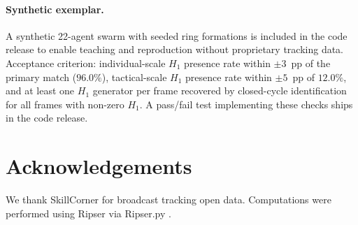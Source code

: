\documentclass[11pt,a4paper]{article}
\begin{document}
\paragraph{Synthetic exemplar.} A synthetic 22-agent swarm with seeded ring formations is included in the code release to enable teaching and reproduction without proprietary tracking data. Acceptance criterion: individual-scale $H_1$ presence rate within $\pm 3$~pp of the primary match ($96.0\%$), tactical-scale $H_1$ presence rate within $\pm 5$~pp of $12.0\%$, and at least one $H_1$ generator per frame recovered by closed-cycle identification for all frames with non-zero $H_1$. A pass/fail test implementing these checks ships in the code release.

\section*{Acknowledgements}

We thank SkillCorner for broadcast tracking open data. Computations were performed using Ripser \citep{Bauer2021} via Ripser.py \citep{Tralie2018}.



\end{document}
